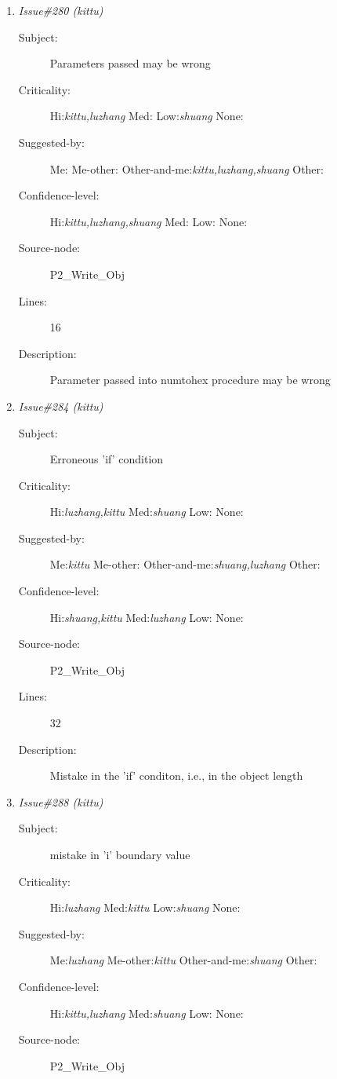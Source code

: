 \begin{enumerate}
\begin{description}
\item [Lines:] 5

\item [Description:] May be a mistake in the parameters passed (objct)
\end{description}
\item {\it Issue\#280 (kittu)}
\begin{description}
\item [Subject:] Parameters passed may be wrong
\item [Criticality:] Hi:{\it kittu,luzhang} Med:{\it } Low:{\it shuang} None:{\it }
\item [Suggested-by:] Me:{\it } Me-other:{\it } Other-and-me:{\it kittu,luzhang,shuang} Other:{\it }
\item [Confidence-level:] Hi:{\it kittu,luzhang,shuang} Med:{\it } Low:{\it } None:{\it }
\item [Source-node:] P2\_Write\_Obj

\item [Lines:] 16

\item [Description:] Parameter passed into numtohex procedure may
be wrong
\end{description}
\item {\it Issue\#284 (kittu)}
\begin{description}
\item [Subject:] Erroneous 'if' condition
\item [Criticality:] Hi:{\it luzhang,kittu} Med:{\it shuang} Low:{\it } None:{\it }
\item [Suggested-by:] Me:{\it kittu} Me-other:{\it } Other-and-me:{\it shuang,luzhang} Other:{\it }
\item [Confidence-level:] Hi:{\it shuang,kittu} Med:{\it luzhang} Low:{\it } None:{\it }
\item [Source-node:] P2\_Write\_Obj

\item [Lines:] 32

\item [Description:] Mistake in the 'if' conditon, i.e., in the
object length
\end{description}
\item {\it Issue\#288 (kittu)}
\begin{description}
\item [Subject:] mistake in 'i' boundary value
\item [Criticality:] Hi:{\it luzhang} Med:{\it kittu} Low:{\it shuang} None:{\it }
\item [Suggested-by:] Me:{\it luzhang} Me-other:{\it kittu} Other-and-me:{\it shuang} Other:{\it }
\item [Confidence-level:] Hi:{\it kittu,luzhang} Med:{\it shuang} Low:{\it } None:{\it }
\item [Source-node:] P2\_Write\_Obj


\end{description}
\end{enumerate}
